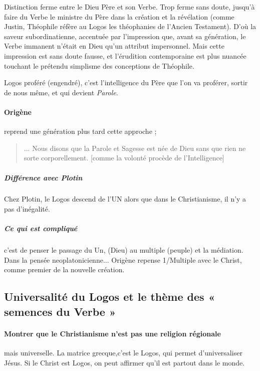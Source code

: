     Distinction ferme entre le Dieu Père et son Verbe. Trop ferme sans doute, jusqu’à faire du Verbe le ministre du Père dans la création et la révélation (comme Justin, Théophile réfère au Logos les théophanies de l’Ancien Testament). D’où la saveur subordinatienne, accentuée par l’impression que, avant sa génération, le Verbe immanent n’était en Dieu qu’un attribut impersonnel. Mais cette impression est sans doute fausse, et l’érudition contemporaine est plus nuancée touchant le prétendu simplisme des conceptions de Théophile.
    
    
    Logos proféré (engendré), c'est l'intelligence du Père que l'on va proférer, sortir de nous même, et qui devient \emph{Parole}.
    
    \paragraph{Origène} reprend une génération plus tard cette approche  ;
    \begin{quote}
        ... Nous disons que la Parole et Sagesse est née de Dieu sans que rien ne sorte corporellement. [comme la volonté procède de l'Intelligence] 
    \end{quote}
    
    \subparagraph{Différence avec Plotin} Chez Plotin, le Logos descend de l'UN alors que dans le Christianisme, il n'y a pas d'inégalité.
    
    
    \subparagraph{Ce qui est compliqué} c'est de penser le passage du Un, (Dieu) au multiple (peuple) et la médiation. Dans la pensée neoplatonicienne... Origène repense 1/Multiple avec le Christ, comme premier de la nouvelle création. 
    
    
    
    \subsection{Universalité du Logos et le thème des « semences du Verbe »}
    
    \paragraph{Montrer que le Christianisme n'est pas une religion régionale} mais universelle. La matrice grecque,c'est le Logos, qui permet d'universaliser Jésus.
    Si le Christ est Logos, on peut affirmer qu'il est partout dans le monde.
    
   
    
